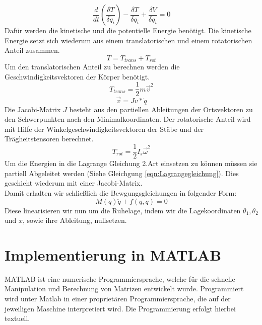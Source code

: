 \documentclass[a4paper, 10pt]{report}
\begin{document}
\begin{equation}
\label{eqn:Lagrangegleichung}
\dfrac{d}{dt}(\dfrac{\delta T}{\delta \dot{q_{i}}})-\dfrac{\delta T}{\delta q_{i}}+\dfrac{\delta V}{\delta q_{i}}=0
\end{equation}
Dafür werden die kinetische und die potentielle Energie benötigt. Die kinetische Energie setzt sich wiederum aus einem translatorischen und einem rotatorischen Anteil zusammen.
\begin{equation}
T=T_{trans}+T_{rot} 
\end{equation}
Um den translatorischen Anteil zu berechnen werden die Geschwindigkeitsvektoren der Körper benötigt.
\begin{equation}
T_{trans}=\dfrac{1}{2} m \vec{v}^{2} 
\end{equation}
\begin{equation}
\vec{v}=Jv*\dot{q}
\end{equation}
Die Jacobi-Matrix $J$ besteht aus den partiellen Ableitungen der Ortsvektoren zu den Schwerpunkten nach den Minimalkoordinaten.
Der rotatorische Anteil wird mit Hilfe der Winkelgeschwindigkeitsvektoren der Stäbe und der Trägheitstensoren berechnet.
\begin{equation}
T_{rot}=\dfrac{1}{2} I_{s} \vec{\omega}^{2}
\end{equation}
Um die Energien in die Lagrange Gleichung 2.Art einsetzen zu können müssen sie partiell Abgeleitet werden (Siehe Gleichgung \ref{eqn:Lagrangegleichung}). Dies geschieht wiederum mit einer Jacobi-Matrix. \\
Damit erhalten wir schließlich die Bewgungsgleichungen in folgender Form:
\begin{equation}
M(q)\ddot{q} + f(q,\dot{q}) = 0
\end{equation}
Diese linearisieren wir nun um die Ruhelage, indem wir die Lagekoordinaten $\theta_{1}, \theta_{2}$ und $x$, sowie ihre Ableitung, nullsetzen.
\renewcommand{\thechapter}{}
\chapter{Implementierung in MATLAB}
\renewcommand{\thechapter}{3}
%
%
MATLAB ist eine numerische Programmiersprache, welche für die schnelle Manipulation und Berechnung von Matrizen entwickelt wurde. Programmiert wird unter Matlab in einer proprietären Programmiersprache, die auf der jeweiligen Maschine interpretiert wird. Die Programmierung erfolgt hierbei textuell.
\end{document}
